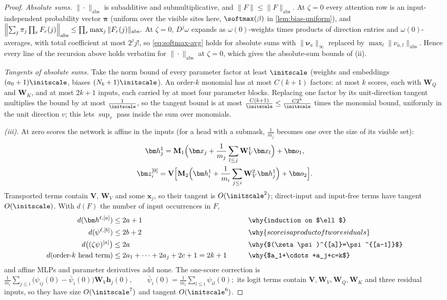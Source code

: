 \begin{proof}
\emph{Absolute sums.} $\|\cdot\|_{\mathrm{abs}}$ is subadditive and submultiplicative, and $\|F\|\le\|F\|_{\mathrm{abs}}$. At $\zeta=0$ every attention row is an
input-independent probability vector $\bm\pi$ (uniform over the visible sites here, $\softmax(\beta)$ in \cref{lem:bias-uniform}), and
 $\Bigl\|\textstyle\sum_j\pi_j\prod_rF_r(j)\Bigr\|_{\mathrm{abs}}\le\prod_r\max_j\|F_r(j)\|_{\mathrm{abs}} .$ 
At $\zeta=0$, $D^j\omega$ expands as $\omega(0)$-weights times products of direction entries and $\omega(0)$-averages, with total coefficient at most $2^jj!$,
so \cref{eq:softmax-avg} holds for absolute sums with $\|\bm\nu_a\|_\infty$ replaced by $\max_l\|\nu_{a,l}\|_{\mathrm{abs}}$. Hence every line of the recursion
above holds verbatim for $\|\cdot\|_{\mathrm{abs}}$ at $\zeta=0$, which gives the absolute-sum bounds of (ii).

\emph{Tangents of absolute sums.} Take the norm bound of every parameter factor at least $\initscale$ (weights and embeddings $(a_0+1)\initscale$,
biases $(N_b+1)\initscale$). An order-$k$ monomial has at most $C(k+1)$ factors: at most $k$ scores, each with $\mathbf W_Q$ and $\mathbf W_K$, and at
most $2k+1$ inputs, each carried by at most four parameter blocks. Replacing one factor by its unit-direction tangent multiplies the bound by at
most $\frac{1}{\initscale}$, so the tangent bound is at most $\frac{C(k+1)}{\initscale}\le\frac{C2^k}{\initscale}$ times the monomial bound, uniformly in the unit direction
$v$; this lets $\sup_v$ pass inside the sum over monomials.

\emph{(iii).} At zero scores the network is affine in the inputs (for a head with a submask, $\frac{1}{m_j}$ becomes one over the size of its
visible set):
\begin{gather*}
 \bm h^1_j=\mathbf M_1\Bigl(\bm x_j+\frac{1}{m_j}\sum_{l\le j}\mathbf W^1_V\bm x_l\Bigr)+\bm o_1,\\
 \bm z^{[0]}_i=\mathbf V\Bigl[\mathbf M_2\Bigl(\bm h^1_i+\frac{1}{m_i}\sum_{j\le i}\mathbf W^2_V\bm h^1_j\Bigr)+\bm o_2\Bigr].
\end{gather*}
Transported terms contain $\mathbf V$, $\mathbf W_V$ and some $\bm x_j$, so their tangent is $O(\initscale^2)$; direct-input and input-free terms have tangent $O(\initscale)$.
With $d(F)$ the number of input occurrences in $F$,
\begin{alignat*}{2}
 d(\bm h^{\ell,[a]})&\le2a+1 &\qquad& \why{induction on $\ell$}\\
 d(\psi^{\ell,[b]})&\le2b+2 && \why{score is a product of two residuals}\\
 d\bigl((\zeta\psi)^{[a]}\bigr)&\le2a && \why{$(\zeta\psi)^{[a]}=\psi^{[a-1]}$}\\
 d(\text{order-$k$ head term})&\le2a_1+\cdots+2a_j+2c+1=2k+1 && \why{$a_1+\cdots+a_j+c=k$}
\end{alignat*}
and affine MLPs and parameter derivatives add none. The one-score correction is
 $\frac{1}{m_i}\sum_{j\le i}\bigl(\psi_{ij}(0)-\bar\psi_i(0)\bigr)\mathbf W_V\bm h_j(0),\qquad \bar\psi_i(0)=\frac{1}{m_i}\sum_{l\le i}\psi_{il}(0);$ 
its logit terms contain $\mathbf V,\mathbf W_V,\mathbf W_Q,\mathbf W_K$ and three residual inputs, so they have size $O(\initscale^7)$ and tangent $O(\initscale^6)$.


\end{proof}
